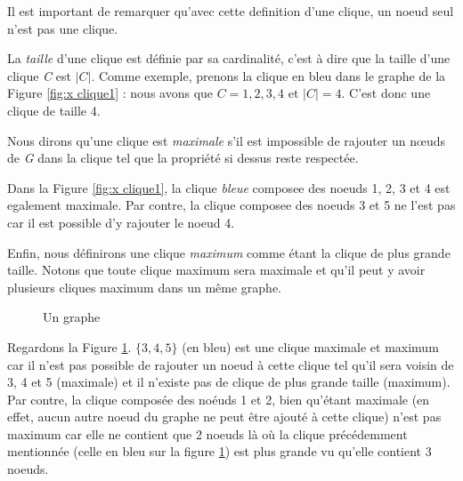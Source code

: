 \documentclass[12pt,a4paper]{article}
\begin{document}
Il est important de remarquer qu'avec cette definition d'une clique, un noeud seul n'est pas une clique.

La \textit{taille} d'une clique est définie par sa cardinalité, c'est à dire que la taille d'une clique \emph{C} est \(|C|\). Comme exemple, prenons la clique en bleu dans le graphe de la Figure \ref{fig:x clique1} : nous avons que \(C = {1,2,3,4}\) et \(|C| = 4\). C'est donc une clique de taille 4.

Nous dirons qu'une clique est \textit{maximale} s'il est impossible de rajouter un nœuds de \emph{G} dans la clique tel que la propriété si dessus reste respectée.

Dans la Figure \ref{fig:x clique1}, la clique \textit{bleue} composee des noeuds 1, 2, 3 et 4 est egalement maximale. Par contre, la clique composee des noeuds 3 et 5 ne l'est pas car il est possible d'y rajouter le noeud 4.

Enfin, nous définirons une clique \textit{maximum} comme étant la clique de plus grande taille. Notons que toute clique maximum sera maximale et qu'il peut y avoir plusieurs cliques maximum dans un même graphe.

\begin{figure}[h]
  \begin{center}
\caption{Un graphe}
  \label{fig:x clique2}
\end{center}
\end{figure}

Regardons la Figure \ref{fig:x clique2}. $ \{3, 4, 5\}$ (en bleu) est une clique maximale et maximum car il n'est pas possible de rajouter un noeud à cette clique tel qu'il sera voisin de 3, 4 et 5 (maximale) et il n'existe pas de clique de plus grande taille (maximum). Par contre, la clique composée des noéuds 1 et 2, bien qu'étant maximale (en effet, aucun autre noeud du graphe ne peut être ajouté à cette clique) n'est pas maximum car elle ne contient que 2 noeuds là où la clique précédemment mentionnée (celle en bleu sur la figure \ref{fig:x clique2}) est plus grande vu qu'elle contient 3 noeuds.
\end{document}
